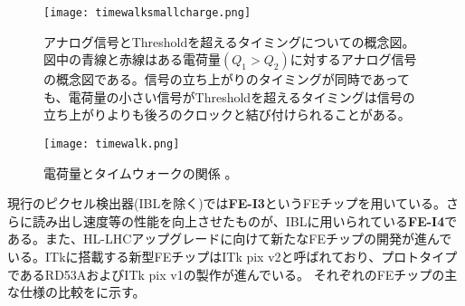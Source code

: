 \begin{figure}[tbp]
  \centering
  \texttt{[image: timewalksmallcharge.png]}
  \caption[ある電荷量から生成されるアナログ信号とThresholdを超えるタイミングの関係]{アナログ信号とThresholdを超えるタイミングについての概念図。図中の青線と赤線はある電荷量$(Q_1>Q_2)$に対するアナログ信号の概念図である。信号の立ち上がりのタイミングが同時であっても、電荷量の小さい信号がThresholdを超えるタイミングは信号の立ち上がりよりも後ろのクロックと結び付けられることがある。}
  \label{fig:timewalksmallcharge}
\end{figure}


\begin{figure}[tbp]
  \centering
  \texttt{[image: timewalk.png]}
  \caption[電荷量とタイムウォークの関係]{電荷量とタイムウォークの関係 \cite{timewalk}。}
  \label{fig:timewalk}
\end{figure}


現行のピクセル検出器(IBLを除く)では\textbf{FE-I3}というFEチップを用いている。さらに読み出し速度等の性能を向上させたものが、IBLに用いられている\textbf{FE-I4}である。また、HL-LHCアップグレードに向けて新たなFEチップの開発が進んでいる。ITkに搭載する新型FEチップはITk pix v2と呼ばれており、プロトタイプであるRD53AおよびITk pix v1の製作が進んでいる。
それぞれのFEチップの主な仕様の比較をに示す。


